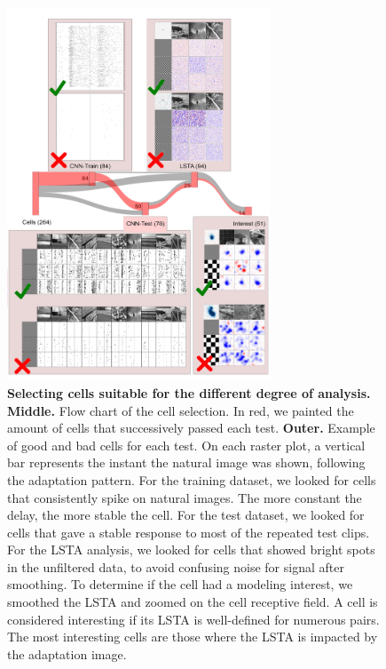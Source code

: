 \begin{figure}
    \centering
    \includegraphics[width=0.7\textwidth]{pics/CellSelection.png}
    \caption{\textbf{Selecting cells suitable for the different degree of
            analysis.} \textbf{Middle.} Flow chart of the cell selection. In
        red, we painted the amount of cells that successively passed each test.
        \textbf{Outer.} Example of good and
        bad cells
        for each test. On each raster plot, a vertical bar represents the
        instant the natural image was shown, following the adaptation pattern.
        For the
        training dataset, we looked for cells that
        consistently spike on natural images. The more constant the delay, the
        more
        stable the cell. For the test dataset, we looked for cells that gave a
        stable
        response to most of the repeated test clips. For the LSTA analysis, we
        looked
        for cells that showed bright spots in the unfiltered data, to avoid
        confusing
        noise for signal after smoothing. To determine if the cell had a
        modeling
        interest, we smoothed the LSTA and zoomed on the cell receptive field.
        A cell
        is considered interesting if its LSTA is well-defined for numerous
        pairs. The
        most interesting cells are those where the LSTA is impacted by the
        adaptation
        image.}
    \label{fig:cell_selecion}
\end{figure}

